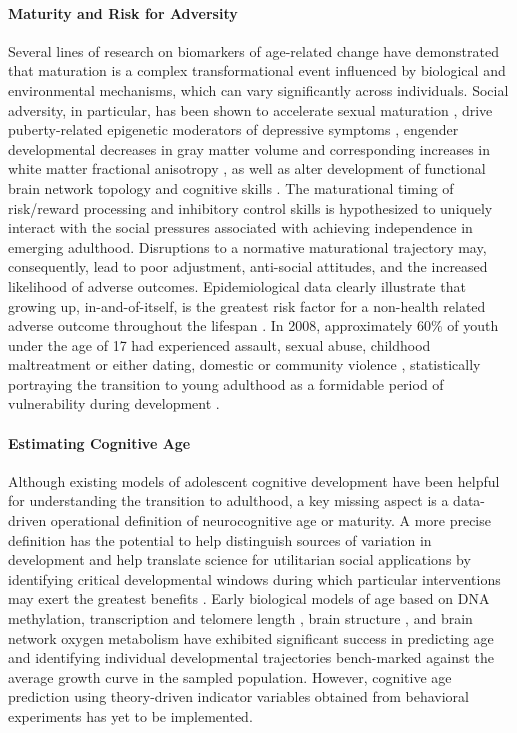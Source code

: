\documentclass[utf8]{stylesheet}
\begin{document}
\paragraph{Maturity and Risk for Adversity}
Several lines of research on biomarkers of age-related change have demonstrated that maturation is a complex transformational event influenced by biological and environmental mechanisms, which can vary significantly across individuals. Social adversity, in particular, has been shown to accelerate sexual maturation \citep{rickard2014childhood}, drive puberty-related epigenetic moderators of depressive symptoms \citep{sumner2019early}, engender developmental decreases in gray matter volume and corresponding increases in white matter fractional anisotropy \citep{gur2019burden, Gogtay2004}, as well as alter development of functional brain network topology \citep{tooley2020associations} and cognitive skills \citep{mclaughlin2019childhood, belsky2019early}. The maturational timing of risk/reward processing and inhibitory control skills is hypothesized to uniquely interact with the social pressures associated with achieving independence in emerging adulthood. Disruptions to a normative maturational trajectory may, consequently, lead to poor adjustment, anti-social attitudes, and the increased likelihood of adverse outcomes. Epidemiological data clearly illustrate that growing up, in-and-of-itself, is the greatest risk factor for a non-health related adverse outcome throughout the lifespan \citep{turner2006effect}. In 2008, approximately 60\% of youth under the age of 17 had experienced assault, sexual abuse, childhood maltreatment or either dating, domestic or community violence \citep{finkelhor2009children}, statistically portraying the transition to young adulthood as a formidable period of vulnerability during development \citep*{berzin2010vulnerability}.
%
\paragraph{Estimating Cognitive Age}
Although existing models of adolescent cognitive development have been helpful for understanding the transition to adulthood, a key missing aspect is a data-driven operational definition of neurocognitive age or maturity. A more precise definition has the potential to help distinguish sources of variation in development and help translate science for utilitarian social applications by identifying critical developmental windows during which particular interventions may exert the greatest benefits \citep{somerville2016searching}. Early biological models of age based on DNA methylation, transcription and telomere length \citep{baker1988biomarkers, jylhava2017biological}, brain structure \citep{khundrakpam2015prediction,aycheh2018biological,madan2018predicting}, and brain network oxygen metabolism \citep{dosenbach2010prediction, qin2015predicting} have exhibited significant success in predicting age and identifying individual developmental trajectories bench-marked against the average growth curve in the sampled population. However, cognitive age prediction using theory-driven indicator variables obtained from behavioral experiments has yet to be implemented. 
%
\end{document}
